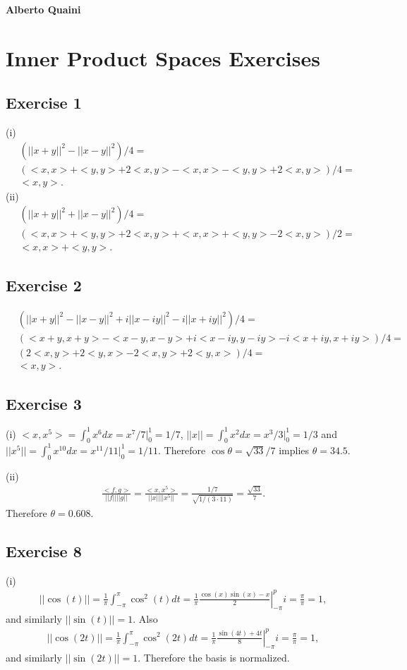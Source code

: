 \documentclass[11.5pt, letterpaper, bibtotoc,
    tablecaptionabove, figurecaptionabove]{article}
\begin{document}
\textbf{Alberto Quaini}

\section*{Inner Product Spaces Exercises}

\subsection*{Exercise 1}
(i)
\begin{align*}
    &\left( ||x+y||^2 - ||x-y||^2 \right)/4=\\
    &\left( <x,x> + <y,y> + 2<x,y> - <x,x> - <y,y> + 2<x,y>\right)/4=\\
    &<x,y>.
\end{align*}
(ii)
\begin{align*}
    &\left( ||x+y||^2 + ||x-y||^2 \right) / 4 =\\
    &\left( <x,x> + <y,y> + 2<x,y> + <x,x> + <y,y> - 2<x,y>\right) / 2 =\\
    &<x,x> + <y,y>.
\end{align*}

\subsection*{Exercise 2}
\begin{align*}
    &(||x+y||^2 - ||x-y||^2 + i||x-iy||^2 - i||x+iy||^2) / 4 =\\
    &(<x+y,x+y> - <x-y,x-y> + i<x-iy,y-iy> - i<x+iy,x+iy>) / 4 =\\ 
    &(2<x,y> + 2<y,x> -2<x,y> +2<y,x>) / 4=\\
    &<x,y>.
\end{align*}

\subsection*{Exercise 3}
(i)
$<x,x^5> = \int_0^1x^6dx=x^7/7|_0^1=1/7$,
$||x|| = \int_0^1x^2dx=x^3/3|_0^1=1/3$ and
$||x^5|| = \int_0^1x^10dx=x^11/11|_0^1=1/11$.
Therefore $\cos\theta=\sqrt{33}/7$ implies $\theta=34.5$.

(ii)
\begin{align*}
    \frac{<f,g>}{||f||||g||}=\frac{<x,x^5>}{||x||||x^5||}=
    \frac{1/7}{\sqrt{1/(3\cdot11)}}=\frac{\sqrt{33}}{7}.
\end{align*}
Therefore $\theta=0.608$.

\subsection*{Exercise 8}
(i)
\begin{align*}
    ||\cos(t)||=\frac{1}{\pi}\int_{-\pi}^\pi\cos^2(t)dt=
    \frac{1}{\pi}\left.\frac{\cos(x)\sin(x)-x}{2}\right\lvert_{-\pi}^pi=\frac{\pi}{\pi}=1,
\end{align*}
and similarly $||\sin(t)||=1$.
Also
\begin{align*}
    ||\cos(2t)||=\frac{1}{\pi}\int_{-\pi}^\pi\cos^2(2t)dt=
    \frac{1}{\pi}\left.\frac{\sin(4t)+4t}{8}\right\lvert_{-\pi}^pi=\frac{\pi}{\pi}=1,
\end{align*}
and similarly $||\sin(2t)||=1$.
Therefore the basis is normalized.
\end{document}
